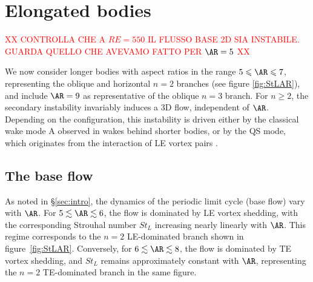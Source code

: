 \section{Elongated bodies}
\label{sec:elongated}

\textcolor{red}{XX CONTROLLA CHE A $RE=550$ IL FLUSSO BASE 2D SIA INSTABILE. GUARDA QUELLO CHE AVEVAMO FATTO PER $\AR=5$ XX}

We now consider longer bodies with aspect ratios in the range $5 \le \AR \le 7$, representing the oblique and horizontal $n=2$ branches (see figure \ref{fig:StLAR}), and include $\AR=9$ as representative of the oblique $n=3$ branch. For $n \ge 2$, the secondary instability invariably induces a 3D flow, independent of $\AR$. Depending on the configuration, this instability is driven either by the classical wake mode A observed in wakes behind shorter bodies, or by the QS mode, which originates from the interaction of LE vortex pairs \citep{chiarini-quadrio-auteri-2022}.

\subsection{The base flow}

As noted in \S\ref{sec:intro}, the dynamics of the periodic limit cycle (base flow) vary with $\AR$. For $5 \lesssim \AR \lesssim 6$, the flow is dominated by LE vortex shedding, with the corresponding Strouhal number $St_L$ increasing nearly linearly with $\AR$. This regime corresponds to the $n=2$ LE-dominated branch shown in figure~\ref{fig:StLAR}. Conversely, for $6 \lesssim \AR \lesssim 8$, the flow is dominated by TE vortex shedding, and $St_L$ remains approximately constant with $\AR$, representing the $n=2$ TE-dominated branch in the same figure.

